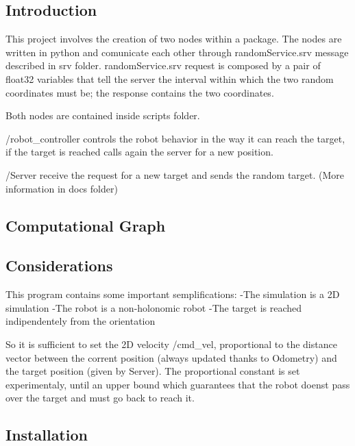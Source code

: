 \subsection*{Introduction}

This project involves the creation of two nodes within a package. The nodes are written in python and comunicate each other through \textquotesingle{}random\+Service.\+srv\textquotesingle{} message described in srv folder. \textquotesingle{}random\+Service.\+srv\textquotesingle{} request is composed by a pair of float32 variables that tell the server the interval within which the two random coordinates must be; the response contains the two coordinates.

Both nodes are contained inside scripts folder.
\begin{DoxyItemize}
\item \textquotesingle{}/robot\+\_\+controller\textquotesingle{} controls the robot behavior in the way it can reach the target, if the target is reached calls again the server for a new position.
\item \textquotesingle{}/\+Server\textquotesingle{} receive the request for a new target and sends the random target. (More information in docs folder)
\end{DoxyItemize}

\subsection*{Computational Graph}



\subsection*{Considerations}

This program contains some important semplifications\+: -\/\+The simulation is a 2D simulation -\/\+The robot is a non-\/holonomic robot -\/\+The target is reached indipendentely from the orientation

So it is sufficient to set the 2D velocity /cmd\+\_\+vel, proportional to the distance vector between the corrent position (always updated thanks to Odometry) and the target position (given by Server). The proportional constant is set experimentaly, until an upper bound which guarantees that the robot doens\textquotesingle{}t pass over the target and must go back to reach it.

\subsection*{Installation}

